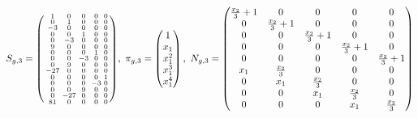 \documentclass[fleqn]{article}
\begin{document}
\bigskip

$
S_{g,3} = \spmqty{ 1 & 0 & 0 & 0 & 0 \\ 0 & 1 & 0 & 0 & 0 \\ -3 & 0 & 0 & 0 & 0 \\ 0 & 0 & 1 & 0 & 0 \\ 0 & -3 & 0 & 0 & 0 \\ 9 & 0 & 0 & 0 & 0 \\ 0 & 0 & 0 & 1 & 0 \\ 0 & 0 & -3 & 0 & 0 \\ 0 & 9 & 0 & 0 & 0 \\ -27 & 0 & 0 & 0 & 0 \\ 0 & 0 & 0 & 0 & 1 \\ 0 & 0 & 0 & -3 & 0 \\ 0 & 0 & 9 & 0 & 0 \\ 0 & -27 & 0 & 0 & 0 \\ 81 & 0 & 0 & 0 & 0 },~
\pi_{g,3} = \pmqty{
    1       \\
    x_{1}   \\
    x_{1}^2 \\
    x_{1}^3 \\
    x_{1}^4 \\
},~
N_{g,3} = \pmqty{
    \frac{x_{2}}{3}+1 & 0                 & 0                 & 0                 & 0                 \\
    0                 & \frac{x_{2}}{3}+1 & 0                 & 0                 & 0                 \\
    0                 & 0                 & \frac{x_{2}}{3}+1 & 0                 & 0                 \\
    0                 & 0                 & 0                 & \frac{x_{2}}{3}+1 & 0                 \\
    0                 & 0                 & 0                 & 0                 & \frac{x_{2}}{3}+1 \\
    x_{1}             & \frac{x_{2}}{3}   & 0                 & 0                 & 0                 \\
    0                 & x_{1}             & \frac{x_{2}}{3}   & 0                 & 0                 \\
    0                 & 0                 & x_{1}             & \frac{x_{2}}{3}   & 0                 \\
    0                 & 0                 & 0                 & x_{1}             & \frac{x_{2}}{3}   \\
}
$
\end{document}
